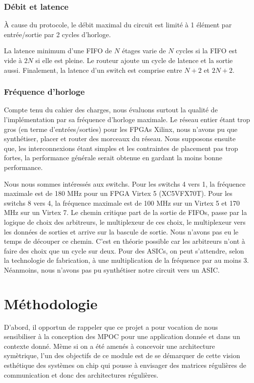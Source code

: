 \documentclass[11pt]{article}
\begin{document}
\subsubsection{Débit et latence}
\`A cause du protocole, le débit maximal du circuit est limité à 1 élément par entrée/sortie par 2 cycles d'horloge.

La latence minimum d'une FIFO de $N$ étages varie de $N$ cycles si la FIFO est vide à $2N$ si elle est pleine. Le routeur ajoute un cycle de latence et la sortie aussi. Finalement, la latence d'un switch est comprise entre $N+2$ et $2N+2$.

\subsubsection{Fréquence d'horloge}
Compte tenu du cahier des charges, nous évaluons surtout la qualité de l'implémentation par sa fréquence d'horloge maximale. Le réseau entier étant trop gros (en terme d'entrées/sorties) pour les FPGAs Xilinx, nous n'avons pu que synthétiser, placer et router des morceaux du réseau. Nous supposons ensuite que, les interconnexions étant simples et les contraintes de placement pas trop fortes, la performance générale serait obtenue en gardant la moins bonne performance.

Nous nous sommes intéressés aux switchs. Pour les switchs 4 vers 1, la fréquence maximale est de 180 MHz pour un FPGA Virtex 5 (XC5VFX70T). Pour les switchs 8 vers 4, la fréquence maximale est de 100 MHz sur un Virtex 5 et 170 MHz sur un Virtex 7. Le chemin critique part de la sortie de FIFOs, passe par la logique de choix des arbitreurs, le multiplexeur de ces choix, le multiplexeur vers les données de sorties et arrive sur la bascule de sortie. Nous n'avons pas eu le temps de découper ce chemin. C'est en théorie possible car les arbitreurs n'ont à faire des choix que un cycle sur deux. Pour des ASICs, on peut s'attendre, selon la technologie de fabrication, à une multiplication de la fréquence par au moins 3. Néanmoins, nous n'avons pas pu synthétiser notre circuit vers un ASIC.

\section{Méthodologie}

D'abord, il opportun de rappeler que ce projet a pour vocation de nous sensibiliser à la conception des MPOC pour une application donnée et dans un contexte donné. Mème si on a été amenés à concevoir une architecture symètrique, l'un des objectifs de ce module est de se démarquer de cette vision esthétique des systèmes on chip qui pousse à envisager des matrices régulières de communication et donc des architectures régulières.
\end{document}

